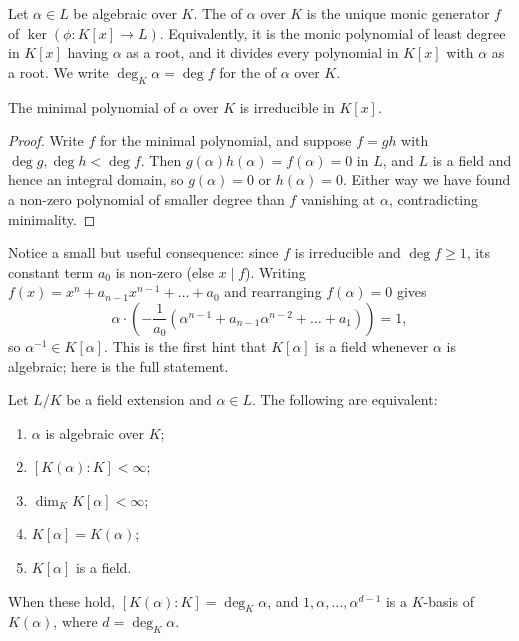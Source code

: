 \begin{definition}
	Let $\alpha \in L$ be algebraic over $K$. The  of $\alpha$ over $K$ is the unique monic generator $f$ of $\ker(\phi : K[x] \to L)$. Equivalently, it is the monic polynomial of least degree in $K[x]$ having $\alpha$ as a root, and it divides every polynomial in $K[x]$ with $\alpha$ as a root. We write $\deg_K \alpha = \deg f$ for the  of $\alpha$ over $K$.
\end{definition}

\begin{lemma}
	The minimal polynomial of $\alpha$ over $K$ is irreducible in $K[x]$.
\end{lemma}

\begin{proof}
	Write $f$ for the minimal polynomial, and suppose $f = gh$ with $\deg g, \deg h < \deg f$. Then $g(\alpha)h(\alpha) = f(\alpha) = 0$ in $L$, and $L$ is a field and hence an integral domain, so $g(\alpha) = 0$ or $h(\alpha) = 0$. Either way we have found a non-zero polynomial of smaller degree than $f$ vanishing at $\alpha$, contradicting minimality.
\end{proof}

Notice a small but useful consequence: since $f$ is irreducible and $\deg f \geq 1$, its constant term $a_0$ is non-zero (else $x \mid f$). Writing $f(x) = x^n + a_{n-1}x^{n-1} + \dots + a_0$ and rearranging $f(\alpha) = 0$ gives
$$\alpha \cdot \left( -\frac{1}{a_0}\left(\alpha^{n-1} + a_{n-1}\alpha^{n-2} + \dots + a_1 \right)\right) = 1,$$
so $\alpha^{-1} \in K[\alpha]$. This is the first hint that $K[\alpha]$ is a field whenever $\alpha$ is algebraic; here is the full statement.

\begin{proposition}\label{prop:algebraictfae}
	Let $L/K$ be a field extension and $\alpha \in L$. The following are equivalent:
	\begin{enumerate}[label=(\roman*)]
		\item $\alpha$ is algebraic over $K$;
		\item $[K(\alpha) : K] < \infty$;
		\item $\dim_K K[\alpha] < \infty$;
		\item $K[\alpha] = K(\alpha)$;
		\item $K[\alpha]$ is a field.
	\end{enumerate}
	When these hold, $[K(\alpha) : K] = \deg_K \alpha$, and $1, \alpha, \dots, \alpha^{d-1}$ is a $K$-basis of $K(\alpha)$, where $d = \deg_K \alpha$.
\end{proposition}

